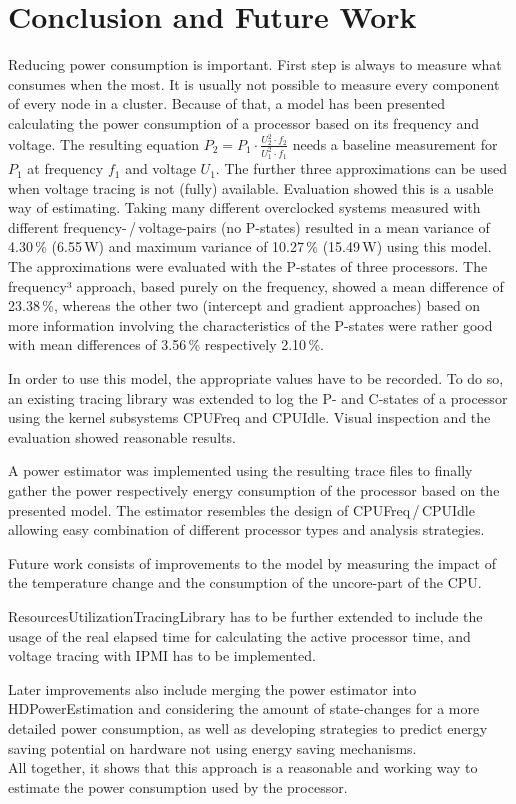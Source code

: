 \chapter{Conclusion and Future Work}
\enlargethispage{5\baselineskip}
Reducing power consumption is important. First step is always to measure what consumes when the most. It is usually not possible to measure every component of every node in a cluster. Because of that, a model has been presented calculating the power consumption of a processor based on its frequency and voltage. The resulting equation $P_2 = P_1 \cdot \frac{U_2^2 \cdot f_2}{U_1^2 \cdot f_1}$ needs a baseline measurement for $P_1$ at frequency $f_1$ and voltage $U_1$. The further three approximations can be used when voltage tracing is not (fully) available.
Evaluation showed this is a usable way of estimating. Taking many different overclocked systems measured with different frequency-\,/\,voltage-pairs (no P-states) resulted in a mean variance of 4.30\,\% (6.55\,W) and maximum variance of 10.27\,\% (15.49\,W) using this model. The approximations were evaluated with the P-states of three processors. The frequency³ approach, based purely on the frequency, showed a mean difference of 23.38\,\%, whereas the other two (intercept and gradient approaches) based on more information involving the characteristics of the P-states were rather good with mean differences of 3.56\,\% respectively 2.10\,\%.

In order to use this model, the appropriate values have to be recorded. To do so, an existing tracing library was extended to log the P- and C-states of a processor using the kernel subsystems CPUFreq and CPUIdle. Visual inspection and the evaluation showed reasonable results. 

A power estimator was implemented using the resulting trace files to finally gather the power respectively energy consumption of the processor based on the presented model. The estimator resembles the design of CPUFreq\,/\,CPUIdle allowing easy combination of different processor types and analysis strategies.

\superpar
Future work consists of improvements to the model by measuring the impact of the temperature change and the consumption of the uncore-part of the CPU.

ResourcesUtilizationTracingLibrary has to be further extended to include the usage of the real elapsed time for calculating the active processor time, and voltage tracing with IPMI has to be implemented.

Later improvements also include merging the power estimator into HDPowerEstimation and considering the amount of state-changes for a more detailed power consumption, as well as developing strategies to predict energy saving potential on hardware not using energy saving mechanisms.\\[1em]
All together, it shows that this approach is a reasonable and working way to estimate the power consumption used by the processor.